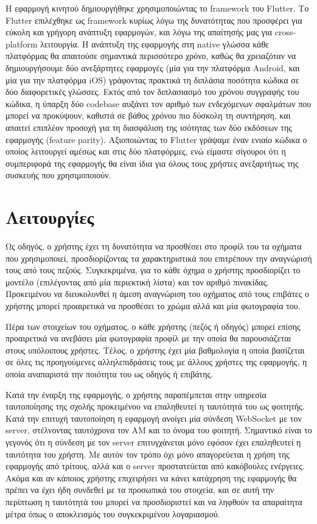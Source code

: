 \documentclass[../thesis.tex]{subfiles}
\begin{document}
Η εφαρμογή κινητού δημιουργήθηκε χρησιμοποιώντας το framework του Flutter.
Το Flutter επιλέχθηκε ως framework κυρίως λόγω της δυνατότητας που προσφέρει για εύκολη και γρήγορη ανάπτυξη εφαρμογών, και λόγω της απαίτησής μας για cross-platform λειτουργία.
Η ανάπτυξη της εφαρμογής στη native γλώσσα κάθε πλατφόρμας θα απαιτούσε σημαντικά περισσότερο χρόνο, καθώς θα χρειαζόταν να δημιουργήσουμε δύο ανεξάρτητες εφαρμογές (μία για την πλατφόρμα Android, και μία για την πλατφόρμα iOS) γράφοντας πρακτικά τη διπλάσια ποσότητα κώδικα σε δύο διαφορετικές γλώσσες.
Εκτός από τον διπλασιασμό του χρόνου συγγραφής του κώδικα, η ύπαρξη δύο codebase αυξάνει τον αριθμό των ενδεχόμενων σφαλμάτων που μπορεί να προκύψουν, καθιστά σε βάθος χρόνου πιο δύσκολη τη συντήρηση, και απαιτεί επιπλέον προσοχή για τη διασφάλιση της ισότητας των δύο εκδόσεων της εφαρμογής (feature parity).
Αξιοποιώντας το Flutter γράψαμε έναν ενιαίο κώδικα ο οποίος λειτουργεί αμέσως και στις δύο πλατφόρμες, ενώ είμαστε σίγουροι ότι η συμπεριφορά της εφαρμογής θα είναι ίδια για όλους τους χρήστες ανεξαρτήτως της συσκευής που χρησιμοποιούν.

\section{Λειτουργίες}

Ως οδηγός, ο χρήστης έχει τη δυνατότητα να προσθέσει στο προφίλ του τα οχήματα που χρησιμοποιεί, προσδιορίζοντας τα χαρακτηριστικά που επιτρέπουν την αναγνώρισή τους από τους πεζούς.
Συγκεκριμένα, για το κάθε όχημα ο χρήστης προσδιορίζει το μοντέλο (επιλέγοντας από μία περιεκτική λίστα) και τον αριθμό πινακίδας.
Προκειμένου να διευκολυνθεί η άμεση αναγνώριση του οχήματος από τους επιβάτες ο χρήστης μπορεί προαιρετικά να προσθέσει το χρώμα αλλά και μία φωτογραφία του.

Πέρα των στοιχείων του οχήματος, ο κάθε χρήστης (πεζός ή οδηγός) μπορεί επίσης προαιρετικά να ανεβάσει μία φωτογραφία προφίλ με την οποία θα παρουσιάζεται στους υπόλοιπους χρήστες.
Τέλος, ο χρήστης έχει μία βαθμολογία η οποία βασίζεται σε όλες τις προηγούμενες αλληλεπιδράσεις τους με άλλους χρήστες της εφαρμογής, η οποία αναπαριστά την ποιότητα του ως οδηγός ή επιβάτης.

\bigskip

Κατά την έναρξη της εφαρμογής, ο χρήστης παραπέμπεται στην υπηρεσία ταυτοποίησης της σχολής προκειμένου να επαληθευτεί η ταυτότητά του ως φοιτητής.
Κατά την επιτυχή ταυτοποίηση η εφαρμογή ανοίγει μία σύνδεση WebSocket με τον server, στέλνοντας ταυτόχρονα τον ΑΜ και το όνομα του φοιτητή.
Σημαντικό είναι το γεγονός ότι η σύνδεση με τον server επιτυγχάνεται μόνο εφόσον έχει επαληθευτεί η ταυτότητα του χρήστη.
Με αυτόν τον τρόπο όχι μόνο απαγορεύεται η χρήση της εφαρμογής από τρίτους, αλλά και ο server προστατεύεται από κακόβουλες ενέργειες.
Ακόμα και αν κάποιος χρήστης επιχειρήσει να κάνει κατάχρηση της εφαρμογής θα πρέπει να έχει ήδη συνδεθεί με τα προσωπικά του στοιχεία, και σε αυτή την περίπτωση η ταυτότητά του μπορεί να προσδιοριστεί και να ληφθούν τα απαραίτητα μέτρα όπως ο αποκλεισμός του συγκεκριμένου λογαριασμού.
\end{document}
